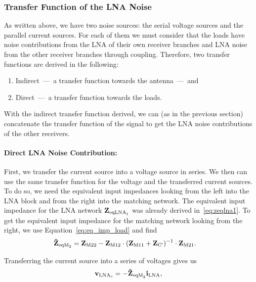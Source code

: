 \subsubsection{Transfer Function of the LNA Noise}
\label{sec:antenna_noise_transf}
As written above, we have two noise sources: the serial voltage sources and the parallel current sources.
For each of them we must consider that the loads have noise contributions from the LNA of their own receiver branches and LNA noise from the other receiver branches through coupling.
Therefore, two transfer functions are derived in the following:
\begin{enumerate}
\item Indirect~---~a transfer function towards the antenna~---~and
\item Direct~---~a transfer function towards the loads.
\end{enumerate}
With the indirect transfer function derived, we can (as in the previous section) concatenate the transfer function of the signal to get the LNA noise contributions of the other receivers. 

\paragraph{Direct LNA Noise Contribution:}
First, we transfer the current source into a voltage source in series.
We then can use the same transfer function for the voltage and the transferred current sources.
To do so, we need the equivalent input impedances looking from the left into the LNA block and from the right into the matching network.
The equivalent input impedance for the LNA network $\mathbf{Z}_{\text{eqLNA}_1}$ was already derived in~\eqref{eq:zeqlna1}.
To get the equivalent input impedance for the matching network looking from the right, we use Equation~\eqref{eq:eq_imp_load} and find
\begin{align}
\label{eq:zr}
\mathbf{\tilde{Z}}_{\text{eqM}_2} &= \mathbf{Z}_\text{M22} - \mathbf{Z}_\text{M12}\cdot(\mathbf{Z}_\text{M11} + \mathbf{Z}_\text{C'})^{-1}\cdot\mathbf{Z}_\text{M21}.
\end{align}

Transferring the current source into a series of voltages gives us 
\begin{equation}
\mathbf{v}_{\text{LNA}_c} = -\mathbf{\tilde{Z}}_{\text{eqM}_2} \mathbf{i}_\text{LNA},
\end{equation}

